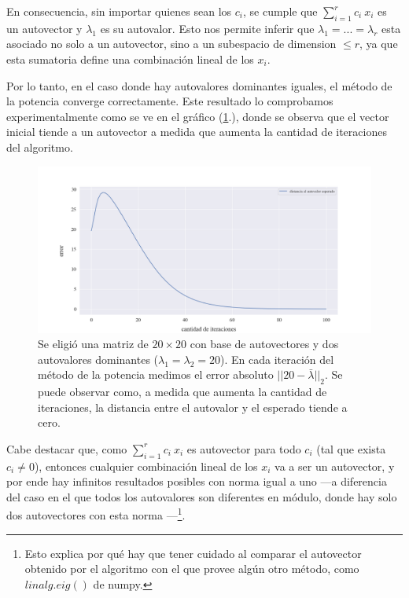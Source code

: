 En consecuencia, sin importar quienes sean los $c_i$, se cumple que $\sum_{i=1}^{r} c_i\ x_i$ es un autovector y $\lambda_1$ es su autovalor. Esto nos permite inferir que $\lambda_1 = ... =\lambda_r$ esta asociado no solo a un autovector, sino a un subespacio de dimension $ \leq r$, ya que esta sumatoria define una combinación lineal de los $x_i$.   

\vspace{1em}
Por lo tanto, en el caso donde hay autovalores dominantes iguales, el método de la potencia converge correctamente. Este resultado lo comprobamos experimentalmente como se ve en el gráfico (\ref{fig:autovalor_repetido}.), donde se observa que el vector inicial tiende a un autovector a medida que aumenta la cantidad de iteraciones del algoritmo.

\begin{figure}[!htbp]
    \includegraphics[scale=0.45]{files/src/.media/op_autovalor_repetido.png}
    \caption{Se eligió una matriz de $20 \times 20$ con base de autovectores y dos autovalores dominantes ($\lambda_1 = \lambda_2 = 20$). En cada iteración del método de la potencia medimos el error absoluto $||20 - \bar{\lambda}||_2$. Se puede observar como, a medida que aumenta la cantidad de iteraciones, la distancia entre el autovalor y el esperado tiende a cero.}
    \label{fig:autovalor_repetido}
\end{figure}

Cabe destacar que, como $\sum_{i=1}^{r} c_i\ x_i$ es autovector para todo $c_i$ (tal que exista $c_i \neq 0$), entonces cualquier combinación lineal de los $x_i$ va a ser un autovector, y por ende hay infinitos resultados posibles con norma igual a uno ---a diferencia del caso en el que todos los autovalores son diferentes en módulo, donde hay solo dos autovectores con esta norma ---\footnote{Esto explica por qué hay que tener cuidado al comparar el autovector obtenido por el algoritmo con el que provee algún otro método, como $linalg.eig()$ de numpy.}.

